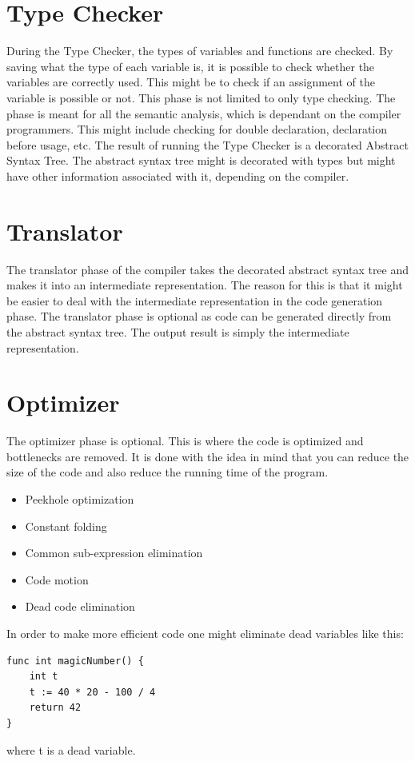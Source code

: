 \section{Type Checker}
During the Type Checker, the types of variables and functions are checked. By saving what the type of each variable is, it is possible to check whether the variables are correctly used. This might be to check if an assignment of the variable is possible or not. This phase is not limited to only type checking. The phase is meant for all the semantic analysis, which is dependant on the compiler programmers. This might include checking for double declaration, declaration before usage, etc.
The result of running the Type Checker is a decorated Abstract Syntax Tree. The abstract syntax tree might is decorated with types but might have other information associated with it, depending on the compiler.

\section{Translator}
The translator phase of the compiler takes the decorated abstract syntax tree and makes it into an intermediate representation. The reason for this is that it might be easier to deal with the intermediate representation in the code generation phase.
The translator phase is optional as code can be generated directly from the abstract syntax tree.
The output result is simply the intermediate representation.

\section{Optimizer}
The optimizer phase is optional. This is where the code is optimized and bottlenecks are removed. It is done with the idea in mind that you can reduce the size of the code and also reduce the running time of the program. 
\begin{itemize}
    \item Peekhole optimization
    \item Constant folding
    \item Common sub-expression elimination
    \item Code motion
    \item Dead code elimination
\end{itemize}{}

In order to make more efficient code one might eliminate dead variables like this:
\begin{verbatim}
func int magicNumber() {
    int t
    t := 40 * 20 - 100 / 4
    return 42
}
\end{verbatim}
where t is a dead variable.

